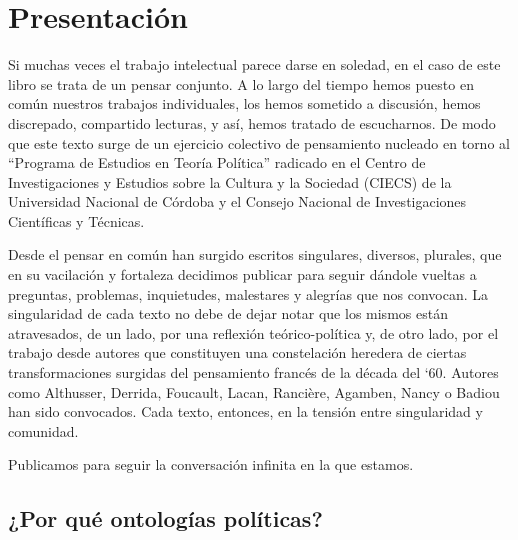 \documentclass{book}
\date{}
\begin{document}
\frontmatter
\maketitle


%
%
%
%
%
%
%
%

\tableofcontents

\mainmatter
\chapter*{Presentación}

Si muchas veces el trabajo intelectual parece darse en soledad, en el
caso de este libro se trata de un pensar conjunto. A lo largo del tiempo
hemos puesto en común nuestros trabajos individuales, los hemos sometido
a discusión, hemos discrepado, compartido lecturas, y así, hemos tratado
de escucharnos. De modo que este texto surge de un ejercicio colectivo
de pensamiento nucleado en torno al \enquote{Programa de Estudios en Teoría
Política} radicado en el Centro de Investigaciones y Estudios sobre la
Cultura y la Sociedad (CIECS) de la Universidad Nacional de Córdoba y el
Consejo Nacional de Investigaciones Científicas y Técnicas.

Desde el pensar en común han surgido escritos singulares, diversos,
plurales, que en su vacilación y fortaleza decidimos publicar para
seguir dándole vueltas a preguntas, problemas, inquietudes, malestares y
alegrías que nos convocan. La singularidad de cada texto no debe de
dejar notar que los mismos están atravesados, de un lado, por una
reflexión teórico-política y, de otro lado, por el trabajo desde autores
que constituyen una constelación heredera de ciertas transformaciones
surgidas del pensamiento francés de la década del `60. Autores como
Althusser, Derrida, Foucault, Lacan, Rancière, Agamben, Nancy o Badiou
han sido convocados. Cada texto, entonces, en la tensión entre
singularidad y comunidad.

Publicamos para seguir la conversación infinita en la que estamos.

\section{¿Por qué ontologías políticas?}
\end{document}
